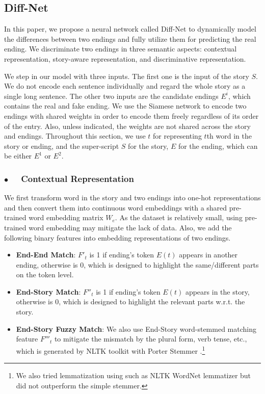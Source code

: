 \documentclass[letterpaper]{article} %
\begin{document}
\subsection{Diff-Net}
In this paper, we propose a neural network called Diff-Net to dynamically model the differences between two endings and fully utilize them for predicting the real ending. 
We discriminate two endings in three semantic aspects: contextual representation, story-aware representation, and discriminative representation.

We step in our model with three inputs.
The first one is the input of the story $S$. We do not encode each sentence individually and regard the whole story as a single long sentence.
The other two inputs are the candidate endings $E^i$, which contains the real and fake ending.
We use the Siamese network \cite{chopra-etal-2005} to encode two endings with shared weights in order to encode them freely regardless of its order of the entry.
Also, unless indicated, the weights are not shared across the story and endings.
Throughout this section, we use $t$ for representing $t$th word in the story or ending, and the super-script $S$ for the story, $E$ for the ending, which can be either $E^1$ or $E^2$.

\subsubsection*{$\bullet$~~ Contextual Representation}
We first transform word in the story and two endings into one-hot representations and then convert them into continuous word embeddings with a shared pre-trained word embedding matrix $W_e$. As the dataset is relatively small, using pre-trained word embedding may mitigate the lack of data. 
Also, we add the following binary features into embedding representations of two endings.
\begin{itemize}
	\item {\bf End-End Match}: $F'_t$ is 1 if ending's token $E(t)$ appears in another ending, otherwise is 0, which is designed to highlight the same/different parts on the token level.
	\item {\bf End-Story Match}: $F''_t$ is 1 if ending's token $E(t)$ appears in the story, otherwise is 0, which is designed to highlight the relevant parts w.r.t. the story.
	\item {\bf End-Story Fuzzy Match}: We also use End-Story word-stemmed matching feature $F'''_t$ to mitigate the mismatch by the plural form, verb tense, etc., which is generated by NLTK toolkit \cite{nltk} with Porter Stemmer \cite{porter1980algorithm}.\footnote{We also tried lemmatization using such as NLTK WordNet lemmatizer but did not outperform the simple stemmer.}
\end{itemize}
\end{document}
